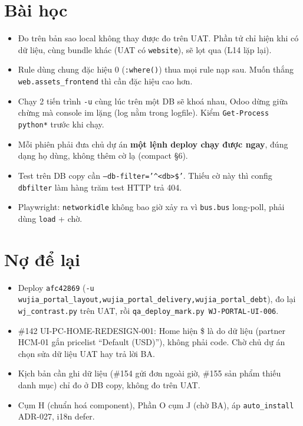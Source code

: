 \section{Bài học}

\begin{itemize}[nosep]
\item Đo trên bản sao local không thay được đo trên UAT. Phần tử chỉ hiện khi có dữ liệu, cùng bundle khác (UAT có
  \texttt{website}), sẽ lọt qua (L14 lặp lại).
\item Rule dùng chung đặc hiệu 0 (\texttt{:where()}) thua mọi rule nạp sau. Muốn thắng \texttt{web.assets\_frontend} thì cần
  đặc hiệu cao hơn.
\item Chạy 2 tiến trình \texttt{-u} cùng lúc trên một DB sẽ khoá nhau, Odoo dừng giữa chừng mà console im lặng (log nằm trong
  logfile). Kiểm \texttt{Get-Process python*} trước khi chạy.
\item Mỗi phiên phải đưa chủ dự án \textbf{một lệnh deploy chạy được ngay}, đúng dạng họ dùng, không thêm cờ lạ (compact §6).
\item Test trên DB copy cần \texttt{--db-filter='\^{}<db>\$'}. Thiếu cờ này thì config \texttt{dbfilter} làm hàng trăm test HTTP
  trả 404.
\item Playwright: \texttt{networkidle} không bao giờ xảy ra vì \texttt{bus.bus} long-poll, phải dùng \texttt{load} + chờ.
\end{itemize}

\section{Nợ để lại}

\begin{itemize}[nosep]
\item Deploy \texttt{afc42869} (\texttt{-u wujia\_portal\_layout,wujia\_portal\_delivery,wujia\_portal\_debt}), đo lại
  \texttt{wj\_contrast.py} trên UAT, rồi \texttt{qa\_deploy\_mark.py WJ-PORTAL-UI-006}.
\item \#142 UI-PC-HOME-REDESIGN-001: Home hiện \$ là do dữ liệu (partner HCM-01 gắn pricelist ``Default (USD)''), không phải
  code. Chờ chủ dự án chọn sửa dữ liệu UAT hay trả lời BA.
\item Kịch bản cần ghi dữ liệu (\#154 gửi đơn ngoài giờ, \#155 sản phẩm thiếu danh mục) chỉ đo ở DB copy, không đo trên UAT.
\item Cụm H (chuẩn hoá component), Phần O cụm J (chờ BA), áp \texttt{auto\_install} ADR-027, i18n defer.
\end{itemize}
